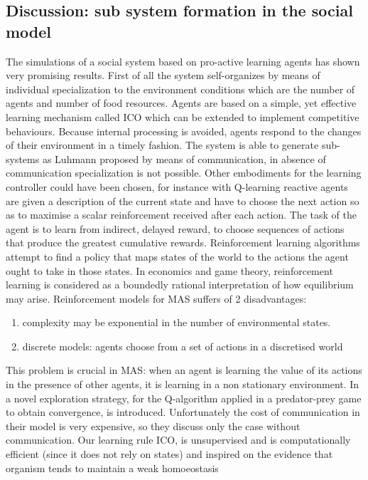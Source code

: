 \subsection{Discussion: sub system formation in the social model}
The simulations of a social system based on pro-active learning agents has shown
very promising results.
First of all the system self-organizes by means of individual specialization 
to the environment conditions which are the number of agents and number of food resources.
Agents are based on a simple, yet effective learning mechanism called ICO which
can be extended to implement competitive behaviours.
Because internal processing is avoided, agents respond to the changes of their
environment in a timely fashion.
The system is able to generate sub-systems as Luhmann proposed by means of communication,
in absence of communication specialization is not possible.
Other embodiments for the learning controller could have been chosen, for instance
with Q-learning \citep{watkins92a} reactive agents are given a description of the
current state and have to choose the next action so as to maximise a scalar
reinforcement received after each action.
The task of the agent is to learn from indirect, delayed reward, to choose sequences of actions
that produce the greatest cumulative rewards. Reinforcement learning algorithms attempt to find
a policy that maps states of the world to the actions the agent ought to take in those states.
In economics and game theory, reinforcement learning is considered as a boundedly rational
interpretation of how equilibrium may arise. Reinforcement models for MAS suffers of 2 disadvantages:
\begin{enumerate}
\item complexity may be exponential in the number of environmental states.
\item discrete models: agents choose from a set of actions in a discretised world
\end{enumerate}
This problem is crucial in MAS: when an agent is learning the value of its actions
in the presence of other agents, it is learning in a non stationary environment.
In \citet{Qlearning-MAS} a novel exploration strategy, for
the Q-algorithm applied in a predator-prey game to obtain convergence, is introduced.
Unfortunately the cost of communication in their model is very expensive,
so they discuss only the case without communication.
Our learning rule ICO, is unsupervised and is computationally efficient (since it does not rely on states)
and inspired on the evidence that organism tends to maintain a weak homoeostasis
